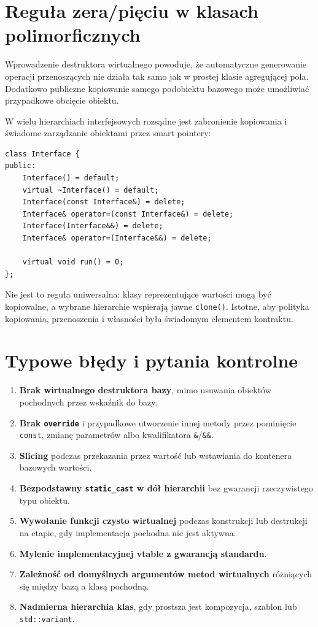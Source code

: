 \section{Reguła zera/pięciu w klasach polimorficznych}

Wprowadzenie destruktora wirtualnego powoduje, że automatyczne
generowanie operacji przenoszących nie działa tak samo jak w prostej
klasie agregującej pola. Dodatkowo publiczne kopiowanie samego
podobiektu bazowego może umożliwiać przypadkowe obcięcie obiektu.

W wielu hierarchiach interfejsowych rozsądne jest zabronienie
kopiowania i świadome zarządzanie obiektami przez smart pointery:

\begin{lstlisting}[caption={Niekopiowalna klasa bazowa interfejsu (C++11); fragment.}]
class Interface {
public:
    Interface() = default;
    virtual ~Interface() = default;
    Interface(const Interface&) = delete;
    Interface& operator=(const Interface&) = delete;
    Interface(Interface&&) = delete;
    Interface& operator=(Interface&&) = delete;

    virtual void run() = 0;
};
\end{lstlisting}

\noindent Nie jest to reguła uniwersalna: klasy reprezentujące wartości
mogą być kopiowalne, a wybrane hierarchie wspierają jawne
\texttt{clone()}. Istotne, aby polityka kopiowania, przenoszenia
i własności była świadomym elementem kontraktu.

\section{Typowe błędy i pytania kontrolne}

\begin{enumerate}
\item \textbf{Brak wirtualnego destruktora bazy}, mimo usuwania
  obiektów pochodnych przez wskaźnik do bazy.
\item \textbf{Brak \texttt{override}} i przypadkowe utworzenie innej metody
  przez pominięcie \texttt{const}, zmianę parametrów albo
  kwalifikatora \texttt{\&}/\texttt{\&\&}.
\item \textbf{Slicing} podczas przekazania przez wartość lub
  wstawiania do kontenera bazowych wartości.
\item \textbf{Bezpodstawny \texttt{static\_cast} w dół hierarchii}
  bez gwarancji rzeczywistego typu obiektu.
\item \textbf{Wywołanie funkcji czysto wirtualnej} podczas konstrukcji
  lub destrukcji na etapie, gdy implementacja pochodna nie jest aktywna.
\item \textbf{Mylenie implementacyjnej vtable z gwarancją standardu}.
\item \textbf{Zależność od domyślnych argumentów metod wirtualnych}
  różniących się między bazą a klasą pochodną.
\item \textbf{Nadmierna hierarchia klas}, gdy prostsza jest kompozycja,
  szablon lub \texttt{std::variant}.
\end{enumerate}

